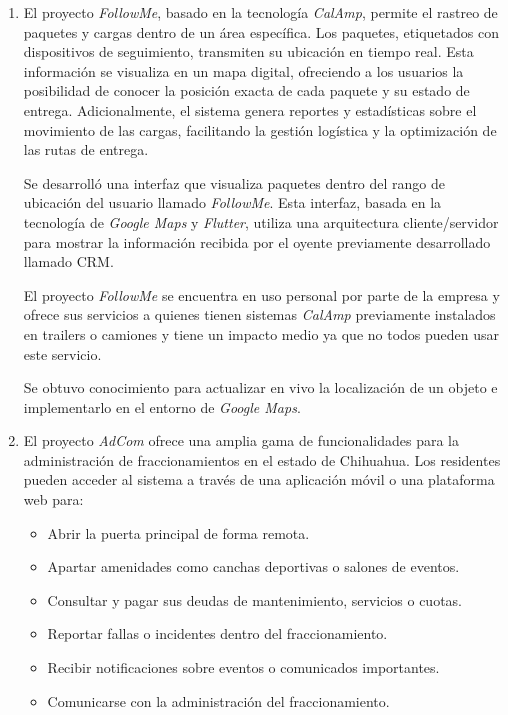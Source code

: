 \documentclass[protocolo.tex]{subfiles}
\begin{document}
\begin{enumerate}
\item El proyecto \textit{FollowMe}, basado en la tecnología \textit{CalAmp}, permite el rastreo de paquetes y cargas dentro de un área específica. Los paquetes, etiquetados con dispositivos de seguimiento, transmiten su ubicación en tiempo real. Esta información se visualiza en un mapa digital,  ofreciendo a los usuarios la posibilidad de conocer la posición exacta de cada paquete y su estado de entrega. Adicionalmente, el sistema genera reportes y estadísticas sobre el movimiento de las cargas, facilitando la gestión logística y la optimización de las rutas de entrega.

Se desarrolló una interfaz que visualiza paquetes dentro del rango de ubicación del usuario llamado \textit{FollowMe}. Esta interfaz, basada en la tecnología de \textit{Google Maps} y \textit{Flutter}, utiliza una arquitectura cliente/servidor para mostrar la información recibida por el oyente previamente desarrollado llamado CRM.


El proyecto \textit{FollowMe} se encuentra en uso personal por parte de la empresa y ofrece sus servicios a
quienes tienen sistemas \textit{CalAmp} previamente instalados en trailers o camiones y tiene un
impacto medio ya que no todos pueden usar este servicio.

Se obtuvo conocimiento para actualizar en vivo la localización de un objeto e implementarlo en el
entorno de \textit{Google Maps}.



\item El proyecto \textit{AdCom} ofrece una amplia gama de funcionalidades para la  administración  de  fraccionamientos  en  el  estado  de  Chihuahua.  Los  residentes  pueden  acceder  al  sistema  a  través  de  una  aplicación  móvil  o  una  plataforma  web  para:

\begin{itemize}
\item Abrir la puerta principal de forma remota.
\item Apartar amenidades como canchas deportivas o salones de eventos.
\item Consultar y pagar sus deudas de mantenimiento, servicios o cuotas.
\item Reportar fallas o incidentes dentro del fraccionamiento.
\item Recibir notificaciones sobre eventos o comunicados importantes.
\item Comunicarse con la administración del fraccionamiento.
\end{itemize}


\end{enumerate}
\end{document}
